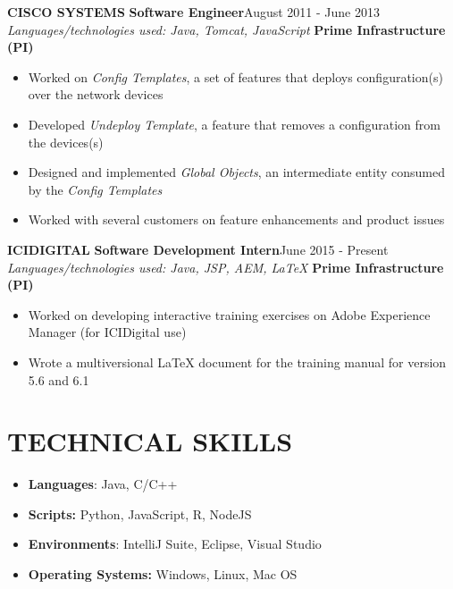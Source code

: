 \documentclass{article}
\begin{document}
\begin{multicols}{2}
			{\bfseries CISCO SYSTEMS}\newline
			{\bfseries \small Software Engineer}\hfill{August 2011 - June 2013}\newline			
				\textit{Languages/technologies used: Java, Tomcat, JavaScript}\newline
				{\bfseries Prime Infrastructure (PI)}
				\begin{itemize}[nolistsep,leftmargin=*]
					\item Worked on \textit{Config Templates}, a set of features that deploys configuration(s) over the network devices
					\item Developed \textit{Undeploy Template}, a feature that removes a configuration from the devices(s)
					\item Designed and implemented \textit{Global Objects}, an intermediate entity consumed by the \textit{Config Templates}
					\item Worked with several customers on feature enhancements and product issues
				\end{itemize}
			\vspace{0.3cm}
				
			{\bfseries ICIDIGITAL}\newline
			{\bfseries \small Software Development Intern}\hfill{June 2015 - Present}\newline			
				\textit{Languages/technologies used: Java, JSP, AEM, LaTeX}\newline
				{\bfseries Prime Infrastructure (PI)}
				\begin{itemize}[nolistsep,leftmargin=*]
					\item Worked on developing interactive training exercises on Adobe Experience Manager (for ICIDigital use)
					\item Wrote a multiversional LaTeX document for the training manual for version 5.6 and 6.1
				\end{itemize}

		\columnbreak

		\section*{TECHNICAL SKILLS}
			\begin{itemize}[nolistsep,leftmargin=*]
				\item \textbf{Languages}: Java, C/C++
				\item \textbf{Scripts:} Python, JavaScript, R, NodeJS
				\item \textbf{Environments}: IntelliJ Suite, Eclipse, Visual Studio
				\item \textbf{Operating Systems:} Windows, Linux, Mac OS
			\end{itemize}


\end{multicols}
\end{document}
